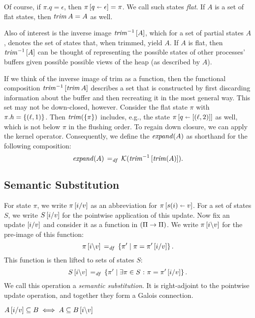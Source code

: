 \documentclass[11pt]{report}
\begin{document}
Of course, if $\pi.q = \epsilon$, then $\pi \left[ q \shortleftarrow \epsilon \right] = \pi$. We call such states \emph{flat}. If $A$ is a set of flat states, then $\operatorname{\mathit{trim}}{A} = A$ as well. 

Also of interest is the inverse image $\operatorname{\mathit{trim}}^{-1}\left[A\right]$, which for a set of partial states $A$, denotes the set of states that, when trimmed, yield $A$. If $A$ is flat, then $\operatorname{\mathit{trim}}^{-1}\left[A\right]$ can be thought of representing the possible states of other processes' buffers given possible possible views of the heap (as described by $A$). 

If we think of the inverse image of trim as a function, then the functional composition $\operatorname{\mathit{trim}}^{-1}\left[\operatorname{\mathit{trim}}{A}\right]$ describes a set that is constructed by first discarding information about the buffer and then recreating it in the most general way. This set may not be down-closed, however. Consider the flat state $\pi$ with $\pi.h = \left\lbrace (\ell,1) \right\rbrace$. Then $\operatorname{\mathit{trim}}(\left\lbrace \pi \right\rbrace)$ includes, e.g., the state $\pi \left[ q \shortleftarrow \left[(\ell,2)\right] \right]$ as well, which is not below $\pi$ in the flushing order. To regain down closure, we can apply the kernel operator. Consequently, we define the $\mathit{expand}(A)$ as shorthand for the following composition: \[ \mathit{expand}(A) \operatorname{\;=_{\mathit{df}}\;} \mathcal{K}(\operatorname{\mathit{trim}}^{-1}\left[\operatorname{\mathit{trim}}(A)\right]).\]

\subsection{Semantic Substitution}

For state $\pi$, we write $\pi\left[i / v\right]$ as an abbreviation for $\pi \left[ s(i) \shortleftarrow v \right]$. For a set of states $S$, we write $S\left[i / v\right]$ for the pointwise application of this update. Now fix an update $\left[i / v\right]$ and consider it as a function in $(\Pi \rightarrow \Pi)$. We write $\pi\left[i \backslash v\right]$ for the pre-image of this function: \[ \pi\left[i \backslash v\right] \operatorname{\;=_{\mathit{df}}\;} \left\lbrace \pi' \mid \pi = \pi'\left[i / v\right] \right\rbrace.\] This function is then lifted to sets of states $S$: \[ S\left[i \backslash v\right] \operatorname{\;=_{\mathit{df}}\;} \left\lbrace \pi' \mid \exists \pi \in S \operatorname{\,:\,} \pi = \pi'\left[i / v\right] \right\rbrace.\] We call this operation a \emph{semantic substitution}. It is right-adjoint to the pointwise update operation, and together they form a Galois connection. 


\begin{lemma}
  \label{lem:subst-galois}
  $A\left[i / v\right] \subseteq B \iff A \subseteq B\left[i \backslash v\right]$
\end{lemma}
\end{document}
